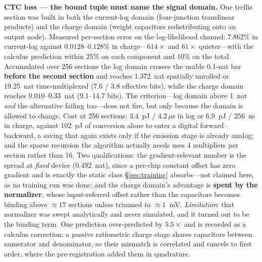 \documentclass[11pt]{article}
\begin{document}
\textbf{CTC loss --- the bound tuple must name the signal domain.} One trellis section was built in both the current-log domain (four-junction translinear products) and the charge domain (weight capacitors redistributing onto an output node). Measured per-section error on the log-likelihood channel: $\mathbf{7.862\%}$ in current-log against $\mathbf{0.0128}$--$\mathbf{0.128\%}$ in charge---$614\times$ and $61\times$ quieter---with the calculus prediction within $25\%$ on each component and $10\%$ on the total. Accumulated over 256 sections the log domain crosses the usable 0.1-nat bar \textbf{before the second section} and reaches 1.372~nat spatially unrolled or 19.25~nat time-multiplexed (7.6 / 3.8 effective bits), while the charge domain reaches $0.010$--$0.33$~nat (9.1--14.7 bits). The criterion---log domain above 1~nat \textit{and} the alternative failing too---does not fire, but only because the domain is allowed to change. Cost at 256 sections: 3.4~pJ / $4.2\,\mu$s in log or 6.9~pJ / 256~ns in charge, against 102~pJ of conversion alone to enter a digital forward--backward, a saving that again exists only if the emission stage is already analog; and the sparse recursion the algorithm actually needs uses 4 multipliers per section rather than 16. Two qualifications: the gradient-relevant number is the spread at \textit{fixed} device (0.492~nat), since a per-chip constant offset has zero gradient and is exactly the static class \S\ref{sec:training} absorbs---not claimed here, as no training run was done; and the charge domain's advantage is \textbf{spent by the normalizer}, whose input-referred offset rather than the capacitors becomes binding above ${\approx}17$ sections unless trimmed to ${\approx}1$~mV. \textit{Limitation}: that normalizer was swept analytically and never simulated, and it turned out to be the binding term. One prediction over-predicted by $5.5\times$ and is recorded as a calculus correction: a passive ratiometric charge stage shares capacitors between numerator and denominator, so their mismatch is correlated and cancels to first order, where the pre-registration added them in quadrature.
\end{document}
